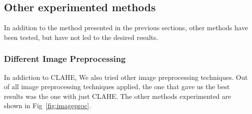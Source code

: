 \documentclass[journal, a4paper]{IEEEtran}
\begin{document}
\subsection{Other experimented methods} 
In addition to the method presented in the previous sections, other methods have been tested, but have not led to the desired results.

\subsubsection{Different Image Preprocessing}
In addiction to CLAHE, We also tried other image preprocessing techniques. Out of all image preprocessing techniques applied, the one that gave us the best results was the one with just CLAHE. The other methods experimented are shown in Fig~\ref{fig:imageproc}.
\end{document}
